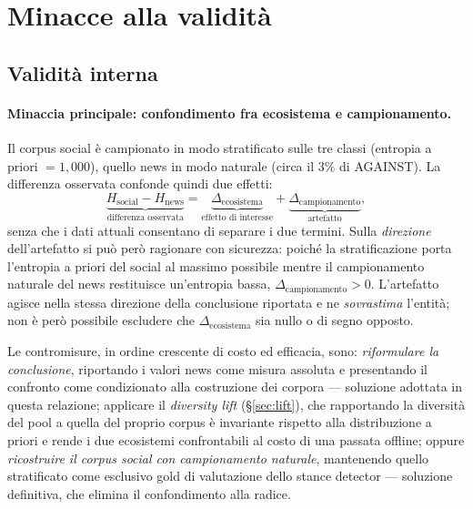 \documentclass[11pt,a4paper]{report}
\begin{document}
\section{Minacce alla validità}

\subsection{Validità interna}\label{sec:validita-interna}
\paragraph{Minaccia principale: confondimento fra ecosistema e campionamento.} Il corpus social è
campionato in modo stratificato sulle tre classi (entropia a priori $=1{,}000$), quello news in
modo naturale (circa il $3\%$ di AGAINST). La differenza osservata confonde quindi due effetti:
\begin{equation}
\underbrace{H_{\text{social}} - H_{\text{news}}}_{\text{differenza osservata}} =
\underbrace{\Delta_{\text{ecosistema}}}_{\text{effetto di interesse}} +
\underbrace{\Delta_{\text{campionamento}}}_{\text{artefatto}} ,
\end{equation}
senza che i dati attuali consentano di separare i due termini. Sulla \emph{direzione}
dell'artefatto si può però ragionare con sicurezza: poiché la stratificazione porta l'entropia a
priori del social al massimo possibile mentre il campionamento naturale del news restituisce
un'entropia bassa, $\Delta_{\text{campionamento}} > 0$. L'artefatto agisce nella stessa direzione
della conclusione riportata e ne \emph{sovrastima} l'entità; non è però possibile escludere che
$\Delta_{\text{ecosistema}}$ sia nullo o di segno opposto.

Le contromisure, in ordine crescente di costo ed efficacia, sono: \emph{riformulare la
conclusione}, riportando i valori news come misura assoluta e presentando il confronto come
condizionato alla costruzione dei corpora --- soluzione adottata in questa relazione; applicare il
\emph{diversity lift} (\S\ref{sec:lift}), che rapportando la diversità del pool a quella del
proprio corpus è invariante rispetto alla distribuzione a priori e rende i due ecosistemi
confrontabili al costo di una passata offline; oppure \emph{ricostruire il corpus social con
campionamento naturale}, mantenendo quello stratificato come esclusivo gold di valutazione dello
stance detector --- soluzione definitiva, che elimina il confondimento alla radice.
\end{document}
